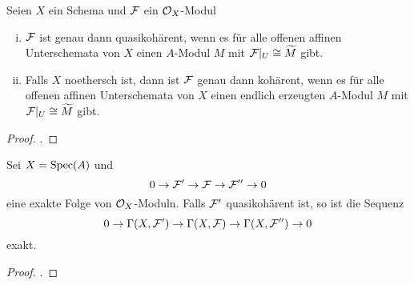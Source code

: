\begin{prop}
\label{prop:9.8}
	Seien $X$ ein Schema und $\mathcal{F}$ ein $\mathcal{O}_X$-Modul
	\begin{enumerate}[i)]
		\item $\mathcal{F}$ ist genau dann quasikohärent, wenn es für alle offenen affinen Unterschemata von $X$ einen $A$-Modul $M$ mit $\mathcal{F}\vert_U \cong \widetilde{M}$ gibt.
		\item Falls $X$ noethersch ist, dann ist $\mathcal{F}$ genau dann kohärent, wenn es für alle offenen affinen Unterschemata von $X$ einen endlich erzeugten $A$-Modul $M$ mit $\mathcal{F}\vert_U \cong \widetilde{M}$ gibt.
	\end{enumerate}
	\begin{proof}
		\cite[Proposition~II.5.9]{hartshorne1977algebraic}.
	\end{proof}
\end{prop}

\begin{prop}
\label{prop:9.9}
	Sei $X=\operatorname{Spec}(A)$ und
	\[
		0 \to \mathcal{F}' \to \mathcal{F} \to \mathcal{F}'' \to 0
	\]
	eine exakte Folge von $\mathcal{O}_X$-Moduln. Falls $\mathcal{F}'$ quasikohärent ist, so ist die Sequenz
	\[
		0 \to \Gamma(X,\mathcal{F}') \to \Gamma(X,\mathcal{F}) \to \Gamma(X,\mathcal{F}'') \to 0	
	\]
	exakt.
	\begin{proof}
		\cite[Proposition~II.5.6]{hartshorne1977algebraic}.
	\end{proof}
\end{prop}

